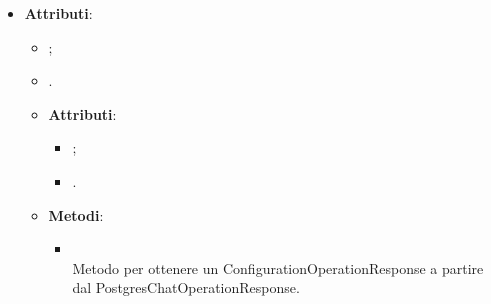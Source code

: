 \documentclass[10pt, a4paper]{article}
\begin{document}
\label{ConfigurationOperationResponseDettaglio}
\begin{itemize}
    \item \textbf{Attributi}:
    \begin{itemize}
        \item {};
        \item {}.
    \end{itemize}
    
\label{PostgresConfigurationOperationResponseDettaglio}
    \begin{itemize}
        
        \item \textbf{Attributi}:
        \begin{itemize}
        \item {};
        \item {}.
        \end{itemize}
        \item \textbf{Metodi}:
        \begin{itemize}
            \item {}\\
            Metodo per ottenere un ConfigurationOperationResponse a partire dal PostgresChatOperationResponse.
        \end{itemize}
        
    \end{itemize}
    
\end{itemize}
    
\end{document}
